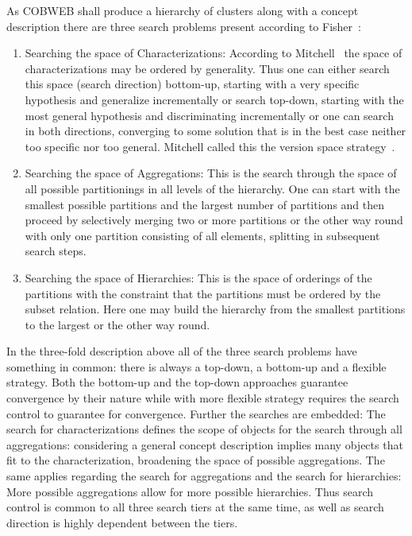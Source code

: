 \noindent As COBWEB shall produce a hierarchy of clusters along with a concept description there are three search problems present according to Fisher~\cite{fisher1985approaches}:
\begin{enumerate}
    \item Searching the space of Characterizations: According to Mitchell~\cite{mitchell1982generalization} the space of characterizations may be ordered by generality. Thus one can either search this space (search direction) bottom-up, starting with a very specific hypothesis and generalize incrementally or search top-down, starting with the most general hypothesis and discriminating incrementally or one can search in both directions, converging to some solution that is in the best case neither too specific nor too general. Mitchell called this the version space strategy~\cite{mitchell1982generalization}.
    \item Searching the space of Aggregations: This is the search through the space of all possible partitionings in all levels of the hierarchy. One can start with the smallest possible partitions and the largest number of partitions and then proceed by selectively merging two or more partitions or the other way round with only one partition consisting of all elements, splitting in subsequent search steps.
    \item Searching the space of Hierarchies: This is the space of orderings of the partitions with the constraint that the partitions must be ordered by the subset relation.  Here one may build the hierarchy from the smallest partitions to the largest or the other way round.
\end{enumerate}
In the three-fold description above all of the three search problems have something in common: there is always a top-down, a bottom-up and a flexible strategy. Both the bottom-up and the top-down approaches guarantee convergence by their nature while with more flexible strategy requires the search control to guarantee for convergence. Further the searches are embedded: The search for characterizations defines the scope of objects for the search through all aggregations: considering a general concept description implies many objects that fit to the characterization, broadening the space of possible aggregations. The same applies regarding the search for aggregations and the search for hierarchies: More possible aggregations allow for more possible hierarchies. Thus search control is common to all three search tiers at the same time, as well as search direction is highly dependent between the tiers. \\

